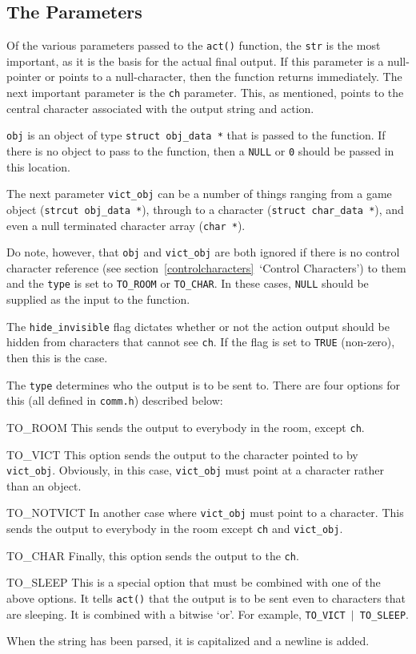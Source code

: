 \documentclass[11pt]{article}
\newenvironment{Ventry}[1]
  {\begin{list}{}{\renewcommand{\makelabel}[1]{\textsf{##1:}\hfil}
    \settowidth{\labelwidth}{\textsf{#1:}}
    \setlength{\leftmargin}{\labelwidth}
    \addtolength{\leftmargin}{\labelsep}
  }
  }
  {\end{list}}
\begin{document}
\subsection{The Parameters}\label{parameters}
Of the various parameters passed to the \texttt{act()} function, the \texttt{str} is the most important, as it is the basis for the actual final output.  If this parameter is a null-pointer or points to a null-character, then the function returns immediately. The next important parameter is the \texttt{ch} parameter.  This, as mentioned, points to the central character associated with the output string and action.
\par
\texttt{obj} is an object of type \texttt{struct obj\_data~*} that is passed to the function.  If there is no object to pass to the function, then a \texttt{NULL} or \texttt{0} should be passed in this location.
\par
The next parameter \texttt{vict\_obj} can be a number of things ranging from a game object (\texttt{strcut obj\_data~*}), through to a character (\texttt{struct char\_data~*}), and even a null terminated character array (\texttt{char~*}).
\par
Do note, however, that \texttt{obj} and \texttt{vict\_obj} are both ignored if there is no control character reference (see section~\vref{controlcharacters}~`Control Characters') to them and the \texttt{type} is set to \texttt{TO\_ROOM} or \texttt{TO\_CHAR}.  In these cases, \texttt{NULL} should be supplied as the input to the function.
\par
The \texttt{hide\_invisible} flag dictates whether or not the action output should be hidden from characters that cannot see \texttt{ch}.  If the flag is set to \texttt{TRUE} (non-zero), then this is the case.
\par
The \texttt{type} determines who the output is to be sent to.  There are four options for this (all defined in \texttt{comm.h}) described below:
\begin{Ventry}{TO\_NOTVICT}
\item[TO\_ROOM] This sends the output to everybody in the room, except \texttt{ch}.
\item[TO\_VICT] This option sends the output to the character pointed to by \texttt{vict\_obj}. Obviously, in this case, \texttt{vict\_obj} must point at a character rather than an object.
\item[TO\_NOTVICT] In another case where \texttt{vict\_obj} must point to a character.  This sends the output to everybody in the room except \texttt{ch} and \texttt{vict\_obj}.
\item[TO\_CHAR] Finally, this option sends the output to the \texttt{ch}.
\item[TO\_SLEEP] This is a special option that must be combined with one of the above options.  It tells \texttt{act()} that the output is to be sent even to characters that are sleeping.  It is combined with a bitwise `or'.  For example, \texttt{TO\_VICT $|$ TO\_SLEEP}.
\end{Ventry}
When the string has been parsed, it is capitalized and a newline is added.
\end{document}
